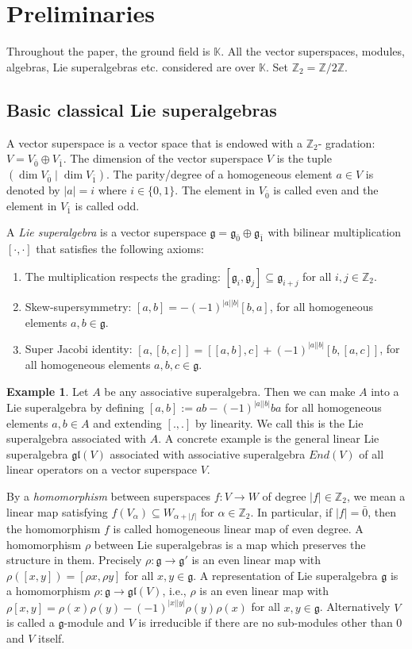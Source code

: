\documentclass[11pt]{amsart}
\theoremstyle{plain}
\theoremstyle{definition}
\newtheorem{ex}[thm]{Example}
\newcommand{\Z}{\mathbb{Z}}
\newcommand{\g}{\mathfrak{g}}
\begin{document}
\section{Preliminaries}\label{sec-prelim}
Throughout the paper, the ground field is $\mathbb{K}$. All the vector superspaces, modules, algebras, Lie superalgebras etc. considered are over $\mathbb{K}.$ Set $\mathbb{Z}_{2}=\mathbb{Z}/ 2 \mathbb{Z}$.
\subsection{Basic classical Lie superalgebras}
  A vector superspace is a vector space that is endowed with a ${\Z}_2$- gradation: $V= V_{\bar{0}}\oplus V_{\bar{1}}$. The dimension of the vector superspace $V$ is the tuple $(\dim V_{\bar{0}} \mid \dim V_{\bar{1}})$. The parity/degree of a homogeneous element $a\in V$ is denoted by $|a|=i$ where $i\in \{0,1\}$. The element in $V_{\bar{0}}$ is called even and the element in $V_{\bar{1}}$ is called odd.



A \emph{Lie superalgebra} is a vector superspace ${\g}={\g_{\bar 0}}\oplus {\g_{\bar 1}}$ with bilinear multiplication $[\cdot,\cdot]$ that satisfies the following axioms:
  \begin{enumerate}[label=(\alph*)]
    \item The multiplication respects the grading: $[\g_i,\g_j] \subseteq \g_{i+j}$ for all $i, j \in \Z_2$.
    \item Skew-supersymmetry: $[a, b]=-(-1)^{|a||b|}[b,a]$, for all homogeneous elements $a, b\in \g$.
    \item Super Jacobi identity: $[a,[b, c]]=[[a, b],c]+(-1)^{|a||b|}[b,[a, c]]$, for all homogeneous elements $a, b, c\in \g$.
  \end{enumerate}


\begin{ex}
Let $A$ be any associative superalgebra. Then we can make $A$ into a Lie superalgebra by defining $[a, b]:=a b -(-1)^{|a||b|}b a$ for all homogeneous elements $a, b \in A$ and extending $[., .]$ by linearity. We call this is the Lie superalgebra associated with $A$. A concrete example is the general linear Lie superalgebra $\mathfrak{g l}(V)$ associated with associative superalgebra $End(V)$ of all linear operators on a vector superspace $V$.
\end{ex}
By a {\it homomorphism} between superspaces $f: V \rightarrow W $ of degree $|f|\in \mathbb{Z}_{2}$, we mean a linear map satisfying $f(V_{\alpha})\subseteq W_{\alpha+|f|}$ for $\alpha \in \mathbb{Z}_{2}$. In particular, if $|f| = \bar{0}$, then the homomorphism $f$ is called homogeneous linear map of even degree.
A homomorphism $\rho$ between  Lie superalgebras is a map which preserves the structure in them. Precisely $\rho: \g \longrightarrow \g'$ is an even linear map with $\rho([x, y])=[\rho x, \rho y]$ for all $x, y \in \g.$
A representation of Lie superalgebra $\g$ is a homomorphism $\rho: \g \longrightarrow \mathfrak{gl}(V)$, i.e., $\rho$ is an even linear map 
with $\rho[x, y]=\rho(x) \rho(y)- (-1)^{ |x| |y|} \rho(y) \rho(x) $ for all $x, y \in \g$. Alternatively $V$ is called a $\g$-module and $V$ is irreducible if there are no sub-modules other than $0$ and $V$ itself.
\end{document}
